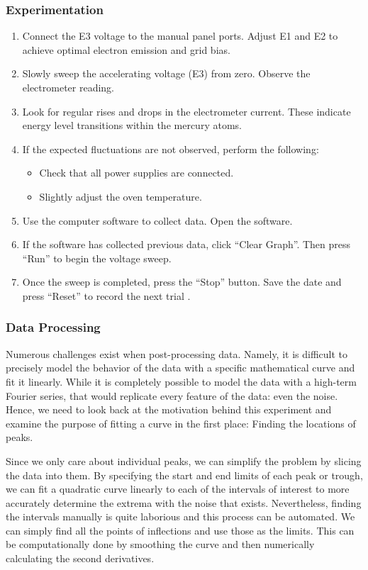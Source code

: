 \documentclass[12pt]{article}
\begin{document}
\subsubsection{Experimentation}
\begin{enumerate}
    \item  Connect the E3 voltage to the manual panel ports. Adjust E1 and E2 to achieve optimal electron emission and grid bias. 
    \item Slowly sweep the accelerating voltage (E3) from zero. Observe the electrometer reading.
    \item Look for regular rises and drops in the electrometer current. These indicate energy level transitions within the mercury atoms.
    \item If the expected fluctuations are not observed, perform the following:
    \begin{itemize}
        \item Check that all power supplies are connected.
        \item Slightly adjust the oven temperature.
    \end{itemize} 
    \item Use the computer software to collect data. Open the software.
    \item If the software has collected previous data, click \enquote{Clear Graph}. Then press \enquote{Run} to begin the voltage sweep.
    \item Once the sweep is completed, press the \enquote{Stop} button. Save the date and press \enquote{Reset} to record the next trial \autocite{manuall}. 
\end{enumerate}

\subsubsection{Data Processing}
Numerous challenges exist when post-processing data. Namely, it is difficult to precisely model the behavior of the data with a specific mathematical curve and fit it linearly. While it is completely possible to model the data with a high-term Fourier series, that would replicate every feature of the data: even the noise. Hence, we need to look back at the motivation behind this experiment and examine the purpose of fitting a curve in the first place: Finding the locations of peaks.

Since we only care about individual peaks, we can simplify the problem by slicing the data into them. By specifying the start and end limits of each peak or trough, we can fit a quadratic curve linearly to each of the intervals of interest to more accurately determine the extrema with the noise that exists. Nevertheless, finding the intervals manually is quite laborious and this process can be automated. We can simply find all the points of inflections and use those as the limits. This can be computationally done by smoothing the curve and then numerically calculating the second derivatives. 
\end{document}

